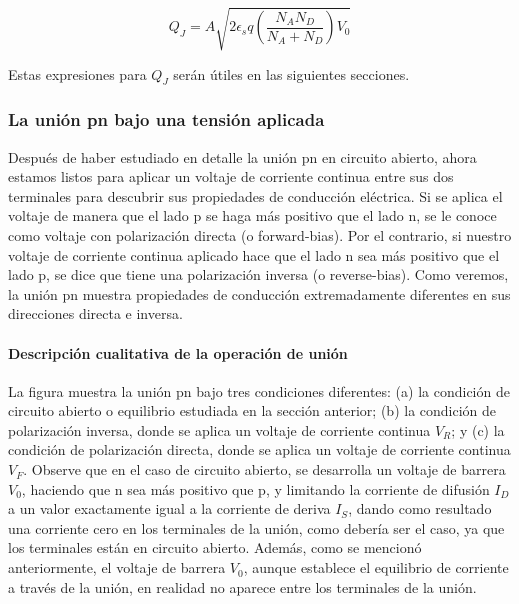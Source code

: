 \begin{equation*}
Q_J = A \sqrt{2 \epsilon_s q \left( \frac{N_A N_D}{N_A + N_D} \right)V_0}
\end{equation*}

Estas expresiones para \( Q_J \) serán útiles en las siguientes secciones.

\subsubsection{La unión pn bajo una tensión aplicada}

Después de haber estudiado en detalle la unión pn en circuito abierto, ahora estamos listos para aplicar un voltaje de corriente continua entre sus dos terminales para descubrir sus propiedades de conducción eléctrica. Si se aplica el voltaje de manera que el lado p se haga más positivo que el lado n, se le conoce como voltaje con polarización directa (o forward-bias). Por el contrario, si nuestro voltaje de corriente continua aplicado hace que el lado n sea más positivo que el lado p, se dice que tiene una polarización inversa (o reverse-bias). Como veremos, la unión pn muestra propiedades de conducción extremadamente diferentes en sus direcciones directa e inversa.

\paragraph*{Descripción cualitativa de la operación de unión}


La figura muestra la unión pn bajo tres condiciones diferentes: (a) la condición de circuito abierto o equilibrio estudiada en la sección anterior; (b) la condición de polarización inversa, donde se aplica un voltaje de corriente continua \(V_R\); y (c) la condición de polarización directa, donde se aplica un voltaje de corriente continua \(V_F\). Observe que en el caso de circuito abierto, se desarrolla un voltaje de barrera \(V_0\), haciendo que n sea más positivo que p, y limitando la corriente de difusión \(I_D\) a un valor exactamente igual a la corriente de deriva \(I_S\), dando como resultado una corriente cero en los terminales de la unión, como debería ser el caso, ya que los terminales están en circuito abierto. Además, como se mencionó anteriormente, el voltaje de barrera \(V_0\), aunque establece el equilibrio de corriente a través de la unión, en realidad no aparece entre los terminales de la unión.

